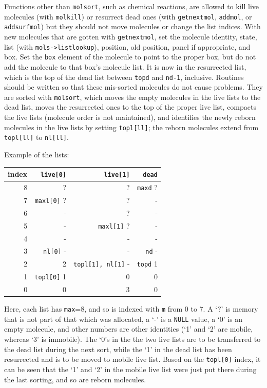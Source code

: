 \documentclass {scrbook}
\newcommand {\ttt} {\texttt}
\begin{document}
Functions other than \ttt{molsort}, such as chemical reactions, are allowed to kill live molecules (with \ttt{molkill}) or resurrect dead ones (with \ttt{getnextmol}, \ttt{addmol}, or \ttt{addsurfmol}) but they should not move molecules or change the list indices. With new molecules that are gotten with \ttt{getnextmol}, set the molecule identity, state, list (with \ttt{mols->listlookup}), position, old position, panel if appropriate, and box. Set the \ttt{box} element of the molecule to point to the proper box, but do not add the molecule to that box's molecule list. It is now in the resurrected list, which is the top of the dead list between \ttt{topd} and \ttt{nd-1}, inclusive. Routines should be written so that these mis-sorted molecules do not cause problems. They are sorted with \ttt{molsort}, which moves the empty molecules in the live lists to the dead list, moves the resurrected ones to the top of the proper live list, compacts the live lists (molecule order is not maintained), and identifies the newly reborn molecules in the live lists by setting \ttt{topl[ll]}; the reborn molecules extend from \ttt{topl[ll]} to \ttt{nl[ll]}.

Example of the lists:

\begin{longtable}[c]{rrrr}
index & \ttt{live[0]} & \ttt{live[1]} & \ttt{dead}\\
\hline
8 & ? & ? & \ttt{maxd} ?\\
7 & \ttt{maxl[0]} ? & ? & -\\
6 & - & ? & -\\
5 & - & \ttt{maxl[1]} ? & -\\
4 & - & - & -\\
3 & \ttt{nl[0]} - & - & \ttt{nd} -\\
2 & 2 & \ttt{topl[1], nl[1]} - & \ttt{topd} 1\\
1 & \ttt{topl[0]} 1 & 0 & 0\\
0 & 0 & 3 & 0\\
 \end{longtable}

Here, each list has \ttt{max}=8, and so is indexed with \ttt{m} from 0 to 7. A `?' is memory that is not part of that which was allocated, a `-' is a \ttt{NULL} value, a `0' is an empty molecule, and other numbers are other identities (`1' and `2' are mobile, whereas `3' is immobile). The `0's in the the two live lists are to be transferred to the dead list during the next sort, while the `1' in the dead list has been resurrected and is to be moved to mobile live list. Based on the \ttt{topl[0]} index, it can be seen that the `1' and `2' in the mobile live list were just put there during the last sorting, and so are reborn molecules.
\end{document}
